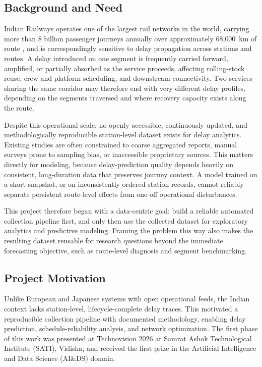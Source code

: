 \documentclass[conference]{IEEEtran}
\begin{document}
\subsection{Background and Need}
Indian Railways operates one of the largest rail networks in the world, carrying more than 8 billion passenger journeys annually over approximately 68{,}000~km of route \cite{indian_railways_stats}, and is correspondingly sensitive to delay propagation across stations and routes. A delay introduced on one segment is frequently carried forward, amplified, or partially absorbed as the service proceeds, affecting rolling-stock reuse, crew and platform scheduling, and downstream connectivity. Two services sharing the same corridor may therefore end with very different delay profiles, depending on the segments traversed and where recovery capacity exists along the route.

Despite this operational scale, no openly accessible, continuously updated, and methodologically reproducible station-level dataset exists for delay analytics. Existing studies are often constrained to coarse aggregated reports, manual surveys prone to sampling bias, or inaccessible proprietary sources. This matters directly for modeling, because delay-prediction quality depends heavily on consistent, long-duration data that preserves journey context. A model trained on a short snapshot, or on inconsistently ordered station records, cannot reliably separate persistent route-level effects from one-off operational disturbances.

This project therefore began with a data-centric goal: build a reliable automated collection pipeline first, and only then use the collected dataset for exploratory analytics and predictive modeling. Framing the problem this way also makes the resulting dataset reusable for research questions beyond the immediate forecasting objective, such as route-level diagnosis and segment benchmarking.

\subsection{Project Motivation}
Unlike European and Japanese systems with open operational feeds, the Indian context lacks station-level, lifecycle-complete delay traces. This motivated a reproducible collection pipeline with documented methodology, enabling delay prediction, schedule-reliability analysis, and network optimization. The first phase of this work was presented at Technovision 2026 at Samrat Ashok Technological Institute (SATI), Vidisha, and received the first prize in the Artificial Intelligence and Data Science (AI\&DS) domain.
\end{document}
